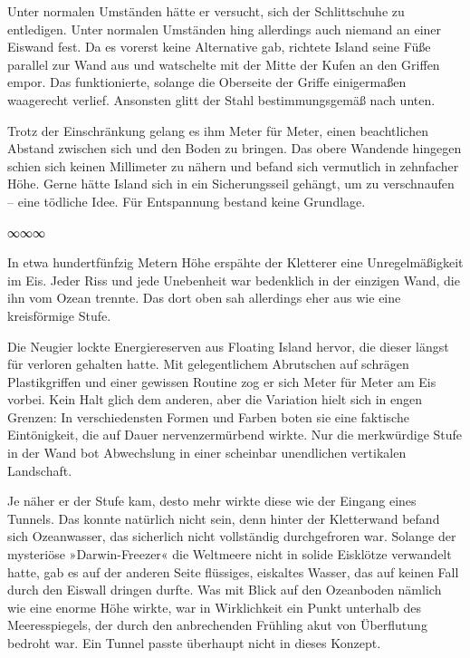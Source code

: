 Unter normalen Umständen hätte er versucht, sich der Schlittschuhe zu entledigen. Unter normalen Umständen hing allerdings auch niemand an einer Eiswand fest. Da es vorerst keine Alternative gab, richtete Island seine Füße parallel zur Wand aus und watschelte mit der Mitte der Kufen an den Griffen empor. Das funktionierte, solange die Oberseite der Griffe einigermaßen waagerecht verlief. Ansonsten glitt der Stahl bestimmungsgemäß nach unten.

Trotz der Einschränkung gelang es ihm Meter für Meter, einen beachtlichen Abstand zwischen sich und den Boden zu bringen. Das obere Wandende hingegen schien sich keinen Millimeter zu nähern und befand sich vermutlich in zehnfacher Höhe. Gerne hätte Island sich in ein Sicherungsseil gehängt, um zu verschnaufen – eine tödliche Idee. Für Entspannung bestand keine Grundlage.

\begin{center}
	∞∞∞
\end{center}

In etwa hundertfünfzig Metern Höhe erspähte der Kletterer eine Unregelmäßigkeit im Eis. Jeder Riss und jede Unebenheit war bedenklich in der einzigen Wand, die ihn vom Ozean trennte. Das dort oben sah allerdings eher aus wie eine kreisförmige Stufe.

Die Neugier lockte Energiereserven aus Floating Island hervor, die dieser längst für verloren gehalten hatte. Mit gelegentlichem Abrutschen auf schrägen Plastikgriffen und einer gewissen Routine zog er sich Meter für Meter am Eis vorbei. Kein Halt glich dem anderen, aber die Variation hielt sich in engen Grenzen: In verschiedensten Formen und Farben boten sie eine faktische Eintönigkeit, die auf Dauer nervenzermürbend wirkte. Nur die merkwürdige Stufe in der Wand bot Abwechslung in einer scheinbar unendlichen vertikalen Landschaft.

Je näher er der Stufe kam, desto mehr wirkte diese wie der Eingang eines Tunnels. Das konnte natürlich nicht sein, denn hinter der Kletterwand befand sich Ozeanwasser, das sicherlich nicht vollständig durchgefroren war. Solange der mysteriöse »Darwin-Freezer« die Weltmeere nicht in solide Eisklötze verwandelt hatte, gab es auf der anderen Seite flüssiges, eiskaltes Wasser, das auf keinen Fall durch den Eiswall dringen durfte. Was mit Blick auf den Ozeanboden nämlich wie eine enorme Höhe wirkte, war in Wirklichkeit ein Punkt unterhalb des Meeresspiegels, der durch den anbrechenden Frühling akut von Überflutung bedroht war. Ein Tunnel passte überhaupt nicht in dieses Konzept.

